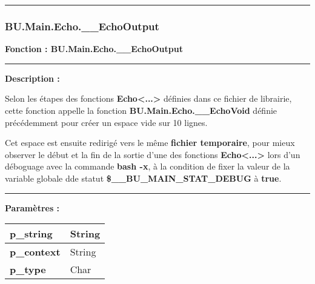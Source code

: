 \documentclass[a4paper,10pt]{article}
\begin{document}


    \color{sec3}\par\noindent\rule{\textwidth}{0.4pt}\color{text}\setlength{\parskip}{1em}

    \color{sec3}
    \subsubsection{BU.Main.Echo.\_\_EchoOutput}\color{text}

    \begin{justify}
        \textbf{Fonction : \color{func}BU.Main.Echo.\_\_EchoOutput}
    \end{justify}


    \par\noindent\rule{\textwidth}{0.4pt}

    \begin{justify}
        \textbf{Description :}

        Selon les étapes des fonctions \textbf{\color{func}Echo<...>} définies dans ce fichier de librairie, cette fonction appelle la fonction \textbf{\color{func}BU.Main.Echo.\_\_EchoVoid} définie précédemment pour créer un espace vide sur 10 lignes.

        Cet espace est ensuite redirigé vers le même \textbf{\color{path}fichier temporaire}, pour mieux observer le début et la fin de la sortie d'une des fonctions \textbf{\color{func}Echo<...>} lors d'un déboguage avec la commande \textbf{\color{cmds}bash -x}, à la condition de fixer la valeur de la variable globale dde statut \textbf{\color{vars}\$\_\_BU\_MAIN\_STAT\_DEBUG} à \textbf{true}.
    \end{justify}


    \par\noindent\rule{\textwidth}{0.4pt}

    \begin{justify}
        \textbf{Paramètres :}

        \begin{tabular}{|l|l|}
            \hline
            \textbf{\color{vars}p\_string} & String\\
            \hline
            \textbf{\color{vars}p\_context} & String\\
            \hline
            \textbf{\color{vars}p\_type} & Char\\
            \hline
        \end{tabular}
    \end{justify}
\end{document}
